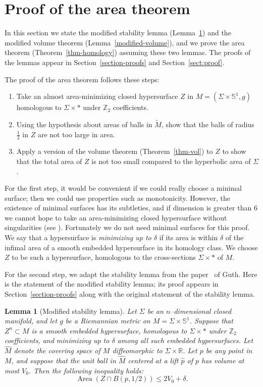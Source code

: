 \documentclass[12pt]{amsart}
\makeatletter
\newtheorem*{rep@theorem}{{Lemma} \ref##}
\newtheorem{lem}[dfn]{Lemma}
	{\newenvironment{rep{lem}}[1]{ } \begin{rep@theorem}} \end{rep@theorem}}
\numberwithin{equation}{section}
\makeatother
\begin{document}
\section{Proof of the area theorem}\label{sect:outline}

In this section we state the modified stability lemma (Lemma~\ref{modified-stability}) and the modified volume theorem (Lemma~\ref{modified-volume}), and we prove the area theorem (Theorem~\ref{thm-homology}) assuming these two lemmas.  The proofs of the lemmas appear in Section~\ref{section-proofs} and Section~\ref{sect:proof}.

The proof of the area theorem follows these steps:
\begin{enumerate}
\item Take an almost area-minimizing closed hypersurface $Z$ in $M = (\Sigma \times \mathbb{S}^1, g)$ homologous to $\Sigma \times \ast$ under $\mathbb{Z}_2$ coefficients.
\item Using the hypothesis about areas of balls in $\widetilde{M}$, show that the balls of radius~$\frac{1}{2}$ in $Z$ are not too large in area.
\item Apply a version of the volume theorem (Theorem~\ref{thm-vol}) to $Z$ to show that the total area of $Z$ is not too small compared to the hyperbolic area of $\Sigma$.
\end{enumerate}

For the first step, it would be convenient if we could really choose a minimal surface; then we could use properties such as monotonicity.  However, the existence of minimal surfaces has its subtleties, and if dimension is greater than 6 we cannot hope to take an area-minimizing closed hypersurface without singularities (see \cite{Simon83}).  Fortunately we do not need minimal surfaces for this proof.  We say that a hypersurface is \emph{minimizing up to $\delta$} if its area is within $\delta$ of the infimal area of a smooth embedded hypersurface in its homology class.  We choose $Z$ to be such a hypersurface, homologous to the cross-sections $\Sigma \times \ast$ of $M$. 

For the second step, we adapt the stability lemma from the paper~\cite{Guth10} of Guth.  Here is the statement of the modified stability lemma; its proof appears in Section~\ref{section-proofs} along with the original statement of the stability lemma.

\begin{lem}[Modified stability lemma]\label{modified-stability}
  Let $\Sigma$ be an $n$--dimensional closed manifold, and let $g$ be a Riemannian metric on $M = \Sigma \times \mathbb{S}^1$.  Suppose that $Z^n \subset M$ is a smooth embedded hypersurface, homologous to $\Sigma \times \ast$ under $\mathbb{Z}_2$ coefficients, and minimizing up to $\delta$ among all such embedded hypersurfaces.  Let $\widehat{M}$ denote the covering space of $M$ diffeomorphic to $\Sigma \times \mathbb{R}$.  Let $p$ be any point in $M$, and suppose that the unit ball in $\widehat{M}$ centered at a lift $\widehat{p}$ of $p$ has volume at most $V_0$.  Then the following inequality holds:
\[\operatorname{Area}(Z \cap B(p, 1/2)) \leq 2V_0 + \delta.\]
\end{lem}
\end{document}

